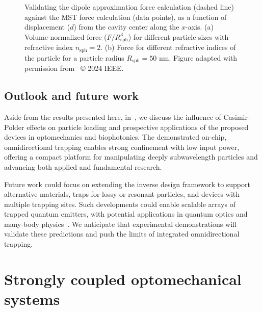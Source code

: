  \begin{figure}[tb]
    \centering
    \caption{Validating the dipole approximation force calculation (dashed line) against the MST force calculation (data points), as a function of displacement ($d$) from the cavity center along the $x$-axis.
    (a) Volume-normalized force ($F/R^3_\text{sph}$) for different particle sizes with refractive index $n_\text{sph}=2$. (b) Force for different refractive indices of the particle for a particle radius $R_\text{sph}=50$ nm. Figure adapted with permission from~\cite{ownpub3} © 2024 IEEE.}
    \label{fig:SPIE}
\end{figure}

\subsection*{Outlook and future work}

Aside from the results presented here, in~\cite{ownpub1}, we discuss the influence of Casimir-Polder effects
 on particle loading and prospective applications of the proposed devices in optomechanics and biophotonics. The demonstrated on-chip, omnidirectional trapping enables strong confinement with low input power, offering a compact platform for manipulating deeply subwavelength particles and advancing both applied and fundamental research.

Future work could focus on extending the inverse design framework to support alternative materials, 
traps for lossy or resonant particles, and devices with multiple trapping sites.
 Such developments could enable scalable arrays of trapped quantum emitters, with potential applications
  in quantum optics and many-body physics~\cite{chang_colloquium_2018}. We anticipate that experimental demonstrations
   will validate these predictions and push the limits of integrated omnidirectional trapping.

\section{Strongly coupled optomechanical systems~\cite{ownpub5}}\label{sec:mech_strongly_coupled}

